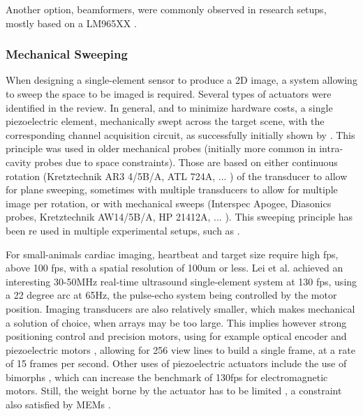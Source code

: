 \documentclass{article}
\begin{document}
Another option, beamformers, were commonly observed in research setups, mostly based on a LM965XX \cite{gwirc_desarrollo_2019,yu_low-power_2012,roman_open-source_2018,bharath_fpga-based_2015,roman_open-source_2018}.

\subsubsection{Mechanical Sweeping}

When designing a single-element sensor to produce a 2D image, a system allowing to sweep the space to be imaged is required. Several types of actuators were identified in the review. In general, and to minimize hardware costs, a single piezoelectric element, mechanically swept across the target scene, with the corresponding channel acquisition circuit, as successfully initially shown by \cite{saijo_development_nodate}. This principle was used in older mechanical probes (initially more common in intra-cavity probes due to space constraints). Those are based on either continuous rotation (Kretztechnik AR3 4/5B/A, ATL 724A, ... ) of the transducer to allow for plane sweeping, sometimes with multiple transducers to allow for multiple image per rotation, or with mechanical sweeps (Interspec Apogee, Diasonics probes, Kretztechnik AW14/5B/A, HP 21412A, ... ). This sweeping principle has been re used in multiple experimental setups, such as \cite{chang_low-cost_2009}.

For small-animals cardiac imaging, heartbeat and target size  require high fps, above 100 fps, with a spatial resolution of 100um or less. Lei et al. \cite{lei_high-frame_nodate} achieved an interesting 30-50MHz real-time ultrasound single-element system at 130 fps, using a 22 degree arc at 65Hz, the pulse-echo system being controlled by the motor position. Imaging transducers are also relatively smaller, which makes mechanical a solution of choice, when arrays may be too large. This implies however strong positioning control and precision motors, using for example optical encoder and  piezoelectric	motors \cite{carotenuto_very_2004}, allowing for 256 view lines to build a single frame, at a rate of 15 frames per second. Other uses of piezoelectric actuators include the use of bimorphs \cite{bezanson_low-cost_2011}, which can increase the benchmark of 130fps for electromagnetic motors. Still, the weight borne by the actuator has to be limited \cite{brown_low_2013,huang_novel_2015}, a constraint also satisfied by MEMs \cite{choi_versatile_2020}.
\end{document}
